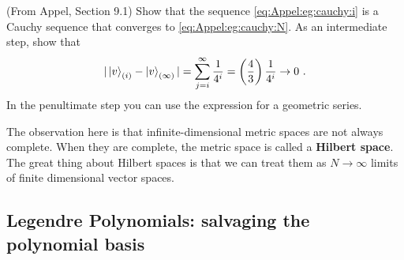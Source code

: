 \documentclass[12pt, oneside]{report}    %
\begin{document}
\begin{exercise}
(From Appel, Section 9.1) Show that the sequence \eqref{eq:Appel:eg:cauchy:i} is a Cauchy sequence that converges to \eqref{eq:Appel:eg:cauchy:N}. As an intermediate step, show that
\begin{align}
    |\left|v\right\rangle_{(i)}-\left|v\right\rangle_{(\infty)}| = \sum_{j=i}^\infty \frac{1}{4^i}
    = \left(\frac{4}{3}\right)\frac{1}{4^i} \to 0 \ .
\end{align}
In the penultimate step you can use the expression for a geometric series.
\end{exercise}

The observation here is that infinite-dimensional metric spaces are not always complete. When they are complete, the metric space is called a \textbf{Hilbert space}. The great thing about Hilbert spaces is that we can treat them as $N\to\infty$ limits of finite dimensional vector spaces. 










\subsection{Legendre Polynomials: salvaging the polynomial basis}

\end{document}
